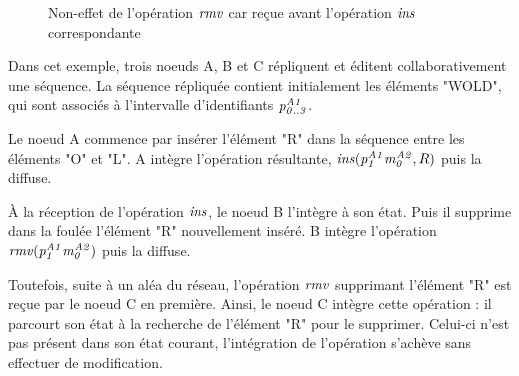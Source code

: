 \begin{figure}[!ht]
{
  }
  \caption{Non-effet de l'opération $\mathit{rmv}$ car reçue avant l'opération $\mathit{ins}$ correspondante}
  \label{fig:why-causal-remove}
\end{figure}

Dans cet exemple, trois noeuds A, B et C répliquent et éditent collaborativement une séquence.
La séquence répliquée contient initialement les éléments "WOLD", qui sont associés à l'intervalle d'identifiants $\mathit{p}^{\mathit{A1}}_{\mathit{0..3}}$.

Le noeud A commence par insérer l'élément "R" dans la séquence entre les éléments "O" et "L".
A intègre l'opération résultante, $\mathit{ins}(\mathit{p}^{\mathit{A1}}_{\mathit{1}}\mathit{m}^{\mathit{A2}}_{\mathit{0}},R)$ puis la diffuse.

À la réception de l'opération $\mathit{ins}$, le noeud B l'intègre à son état.
Puis il supprime dans la foulée l'élément "R" nouvellement inséré.
B intègre l'opération $\mathit{rmv}(\mathit{p}^{\mathit{A1}}_{\mathit{1}}\mathit{m}^{\mathit{A2}}_{\mathit{0}})$ puis la diffuse.

Toutefois, suite à un aléa du réseau, l'opération $\mathit{rmv}$ supprimant l'élément "R" est reçue par le noeud C en première.
Ainsi, le noeud C intègre cette opération : il parcourt son état à la recherche de l'élément "R" pour le supprimer.
Celui-ci n'est pas présent dans son état courant, l'intégration de l'opération s'achève sans effectuer de modification.

